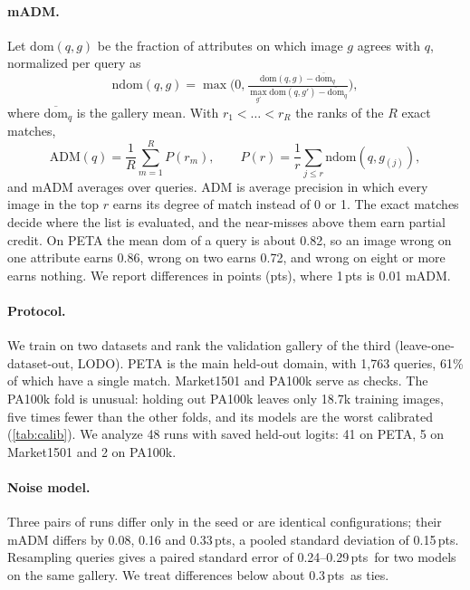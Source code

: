 \documentclass[10pt,twocolumn,letterpaper]{article}
\newcommand{\pts}{\,pts}
\newcommand{\ndom}{\mathrm{ndom}}
\begin{document}
\paragraph{mADM.} Let $\mathrm{dom}(q,g)$ be the fraction of attributes on which image $g$ agrees with $q$, normalized per query as
\begin{equation}
\ndom(q,g)=\max\Big(0,\tfrac{\mathrm{dom}(q,g)-\overline{\mathrm{dom}}_q}{\max_{g'}\mathrm{dom}(q,g')-\overline{\mathrm{dom}}_q}\Big),
\end{equation}
where $\overline{\mathrm{dom}}_q$ is the gallery mean. With $r_1<\dots<r_R$ the ranks of the $R$ exact matches,
\begin{equation}
\mathrm{ADM}(q)=\frac1R\sum_{m=1}^{R}P(r_m),\qquad P(r)=\frac1r\sum_{j\le r}\ndom(q,g_{(j)}),
\end{equation}
and mADM averages over queries. ADM is average precision in which every image in the top $r$ earns its degree of match instead of 0 or 1. The exact matches decide where the list is evaluated, and the near-misses above them earn partial credit. On PETA the mean dom of a query is about 0.82, so an image wrong on one attribute earns 0.86, wrong on two earns 0.72, and wrong on eight or more earns nothing. We report differences in points (pts), where 1\pts{} is 0.01 mADM.

\paragraph{Protocol.} We train on two datasets and rank the validation gallery of the third (leave-one-dataset-out, LODO). PETA is the main held-out domain, with 1{,}763 queries, 61\% of which have a single match. Market1501 and PA100k serve as checks. The PA100k fold is unusual: holding out PA100k leaves only 18.7k training images, five times fewer than the other folds, and its models are the worst calibrated (\cref{tab:calib}). We analyze 48 runs with saved held-out logits: 41 on PETA, 5 on Market1501 and 2 on PA100k.

\paragraph{Noise model.} Three pairs of runs differ only in the seed or are identical configurations; their mADM differs by 0.08, 0.16 and 0.33\pts, a pooled standard deviation of 0.15\pts. Resampling queries gives a paired standard error of 0.24--0.29\pts\ for two models on the same gallery. We treat differences below about 0.3\pts\ as ties.
\end{document}
